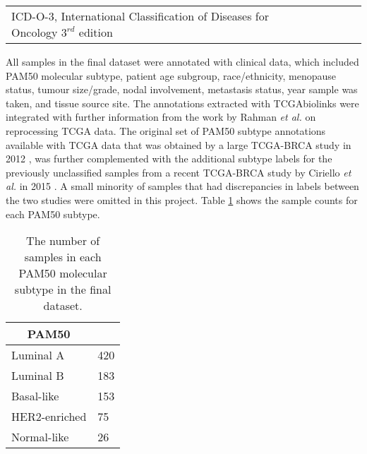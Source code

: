 \begin{table}[!htbp]
\begin{tabular}{lccllclc}
        \multicolumn{3}{l}{%
          \begin{minipage}{8cm}%
            \tiny ICD-O-3, International Classification of Diseases for Oncology $3^{rd}$ edition
          \end{minipage}%
        }\\
            
            
            \end{tabular}
            \end{table}
    
 

    All samples in the final dataset were annotated with clinical data, which included PAM50 molecular subtype, patient age subgroup, race/ethnicity, menopause status, tumour size/grade, nodal involvement, metastasis status, year sample was taken, and tissue source site. The annotations extracted with TCGAbiolinks were integrated with further information from the work by Rahman \textit{et al. }\cite{RahmanAlternativeResults} on reprocessing TCGA data. 
    The original set of PAM50 subtype annotations available with TCGA data that was obtained by a large TCGA-BRCA study in 2012 \cite{CancerGenomeAtlasNetwork2012ComprehensiveTumours}, was further complemented with the additional subtype labels for the previously unclassified samples from a recent TCGA-BRCA study by Ciriello \textit{et al.} in 2015 \cite{Ciriello2015ComprehensiveCancer}. A small minority of samples that had discrepancies in labels between the two studies were omitted in this project.  Table \ref{table:pam50counts} shows the sample counts for each PAM50 subtype. 
    
    
                \begin{table}[!htbp]
                \centering
                \caption{The number of samples in each PAM50 molecular subtype in the final dataset.}
                \label{table:pam50counts}
                \begin{tabular}{ll}
                \multicolumn{1}{c}{\textbf{PAM50}} &  \\ \hline
                \multicolumn{1}{|l|}{Luminal A} & \multicolumn{1}{l|}{420} \\ \hline
                \multicolumn{1}{|l|}{Luminal B} & \multicolumn{1}{l|}{183} \\ \hline
                \multicolumn{1}{|l|}{Basal-like} & \multicolumn{1}{l|}{153} \\ \hline
                \multicolumn{1}{|l|}{HER2-enriched} & \multicolumn{1}{l|}{75} \\ \hline
                \multicolumn{1}{|l|}{Normal-like} & \multicolumn{1}{l|}{26} \\ \hline
                \end{tabular}
                \end{table}
                

